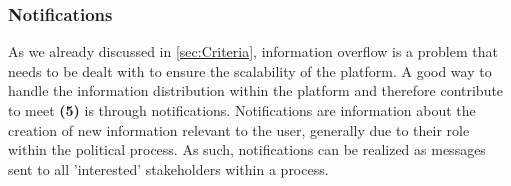 \subsubsection{Notifications}
\label{sec:Notifications}
As we already discussed in \ref{sec:Criteria}, information overflow is a problem that needs to be dealt with to ensure the scalability of the platform.
A good way to handle the information distribution within the platform and therefore contribute to meet \textbf{(5)} is through notifications.
Notifications are information about the creation of new information relevant to the user, generally due to their role within the political process.
As such, notifications can be realized as messages sent to all 'interested' stakeholders within a process.


